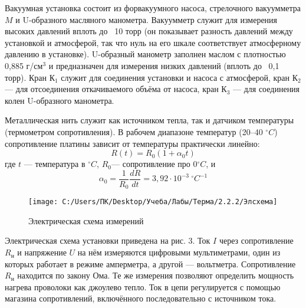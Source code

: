 \documentclass[12pt,a4paper]{article}
\begin{document}
	Вакуумная установка состоит из форвакуумного насоса, стрелочного вакуумметра $M$ и U-образного масляного манометра. Вакуумметр служит для измерения высоких давлений вплоть до ~10 торр (он показывает разность давлений между установкой и атмосферой, так что нуль на его шкале соответствует атмосферному давлению в установке). U-образный манометр заполнен маслом с плотностью 0,885 г/см$^3$ и предназначен для измерения низких давлений (вплоть до ~0,1 торр). Кран К$_1$ служит для соединения установки и насоса с атмосферой, кран К$_2$ — для отсоединения откачиваемого объёма от насоса, кран К$_3$ — для соединения колен U-образного манометра.
	
	Металлическая нить служит как источником тепла, так и датчиком температуры (термометром сопротивления). В рабочем диапазоне температур (20–40 $^\circ C$) сопротивление платины зависит от температуры практически линейно:
	\begin{equation}
	R(t)=R_{0}\left(1+\alpha_{0} t\right)
	\end{equation}
	где $t$ --- температура в $^\circ C$, $R_0$--- сопротивление про 0$^\circ C$, и
	\begin{equation}
	\alpha_{0}=\frac{1}{R_{0}} \frac{d R}{d t}=3,92 \cdot 10^{-3} ~^\circ C^{-1}
	\end{equation}
	
	\begin{wrapfigure}{r}{50mm}
		\centering
		\texttt{[image: C:/Users/ПК/Desktop/Учеба/Лабы/Терма/2.2.2/Элсхема]}
		\caption{Электрическая схема измерений}
		\label{fig:}
	\end{wrapfigure}

	Электрическая схема установки приведена на рис. 3. Ток $I$ через сопротивление $R_\text{н}$ и напряжение $U$ на нём измеряются цифровыми мультиметрами, один из которых работает в режиме амперметра, а другой — вольтметра. Сопротивление $R_\text{н}$ находится по закону Ома. Те же измерения позволяют определить мощность нагрева проволоки как джоулево тепло. Ток в цепи регулируется с помощью магазина сопротивлений, включённого последовательно с источником тока.
	
	
	
\end{document}
